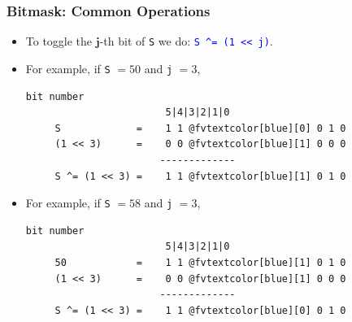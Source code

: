 \documentclass{beamer}
\begin{document}
\begin{frame}[fragile]
\frametitle{Bitmask: Common Operations}

\scriptsize

\begin{itemize}

\item To toggle the $\mathbf{j}$-th bit of \verb+S+ we do: \textcolor{blue}{\texttt{S \textasciicircum= (1 << j)}}.

\vspace{0.1cm}

\item<2-> For example, if \verb+S+ $= 50$ and \verb+j+ $= 3$,

\begin{center}
\begin{Verbatim}[commandchars=@\[\]]
                         bit number
                        5|4|3|2|1|0
     S             =    1 1 @fvtextcolor[blue][0] 0 1 0
     (1 << 3)      =    0 0 @fvtextcolor[blue][1] 0 0 0
                       -------------
     S ^= (1 << 3) =    1 1 @fvtextcolor[blue][1] 0 1 0
\end{Verbatim}
\end{center}

\vspace{0.1cm}

\item<3-> For example, if \verb+S+ $= 58$ and \verb+j+ $= 3$,

\begin{center}
\begin{Verbatim}[commandchars=@\[\]]
                         bit number
                        5|4|3|2|1|0
     50            =    1 1 @fvtextcolor[blue][1] 0 1 0
     (1 << 3)      =    0 0 @fvtextcolor[blue][1] 0 0 0
                       -------------
     S ^= (1 << 3) =    1 1 @fvtextcolor[blue][0] 0 1 0
\end{Verbatim}
\end{center}

\end{itemize}

\end{frame}
\end{document}
